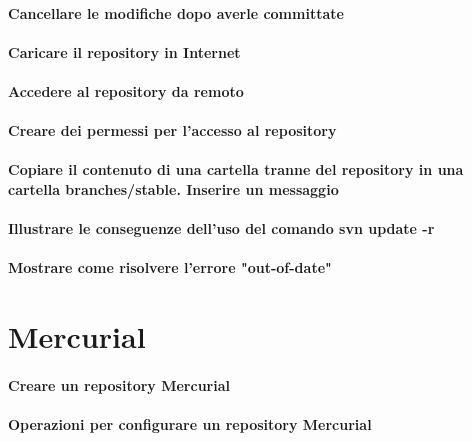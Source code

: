 \documentclass[a4paper]{article}
\begin{document}
	\paragraph{Cancellare le modifiche dopo averle committate}
	
	\paragraph{Caricare il repository in Internet}
	
	\paragraph{Accedere al repository da remoto}
	
	\paragraph{Creare dei permessi per l'accesso al repository}
	
	\paragraph{Copiare il contenuto di una cartella tranne del repository in una cartella branches/stable. Inserire un messaggio}

	\paragraph{Illustrare le conseguenze dell'uso del comando svn update -r}
	
	\paragraph{Mostrare come risolvere l'errore "out-of-date"}	
	

	
	\section{Mercurial} %
	
		\paragraph{Creare un repository Mercurial}
		
		\paragraph{Operazioni per configurare un repository Mercurial}
		
\end{document}
